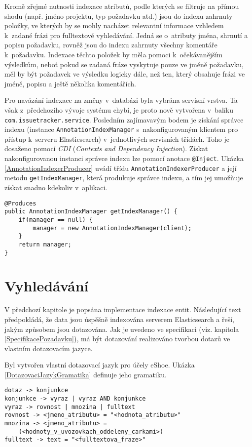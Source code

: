 \documentclass[11pt,oneside]{fithesis2}
\begin{document}
Kromě zřejmé nutnosti indexace atributů, podle kterých se filtruje na přímou shodu (např. jméno projektu, typ požadavku atd.) jsou do indexu zahrnuty položky, ve kterých by se mohly nacházet relevantní informace vzhledem k~zadané frázi pro fulltextové vyhledávání. Jedná se o~atributy jména, shrnutí a popisu požadavku, rovněž jsou do indexu zahrnuty všechny komentáře k~požadavku. Indexace těchto položek by měla pomoci k~očekávanějším výsledkům, neboť pokud se zadaná fráze vyskytuje pouze ve jméně požadavku, měl by být požadavek ve výsledku logicky dále, než ten, který obsahuje frázi ve jméně, popisu a ještě několika komentářích.

Pro navázání indexace na změny v~databázi byla vybrána servisní vrstva. Ta však z~předchozího vývoje systému chybí, je proto nově vytvořena v~balíku \texttt{com.issuetracker.service}. Posledním zajímavavým bodem je získání správce indexu (instance \texttt{AnnotationIndexManager} s~nakonfigurovaným klientem pro přístup k~serveru Elasticsearch) v~jednotlivých servisních třídách. Toho je dosaženo pomocí \emph{CDI} (\emph{Contexts and Dependency Injection}). Získat nakonfigurovanou instanci správce indexu lze pomocí anotace \texttt{@Inject}. Ukázka \ref{AnnotationIndexerProducer} uvádí třídu \texttt{AnnotationIndexerProducer} a její metodu \texttt{getIndexManager}, která produkuje správce indexu, a tím jej umožňuje získat snadno kdekoliv v~aplikaci.

\begin{lstlisting}[caption =  Použití CDI pro získávání správce indexu, label = AnnotationIndexerProducer]
@Produces
public AnnotationIndexManager getIndexManager() {
    if(manager == null) {
        manager = new AnnotationIndexManager(client);
    }
    return manager;
}
\end{lstlisting}

\section{Vyhledávání}
\label{ImplementaceVyhledavani}
V předchozí kapitole je popsána implementace indexace entit. Následující text předpokládá, že data jsou úspěšně indexována serverem Elasticsearch a řeší, jakým způsobem jsou dotazována. Jak je uvedeno ve specifikaci (viz. kapitola \ref{SpecifikacePozadavku}), má být dotazování realizováno tvorbou dotazů ve vlastním dotazovacím jazyce.

Byl vytvořen vlastní dotazovací jazyk pro účely eShoe. Ukázka \ref{DotazovaciJazykGramatika} definuje jeho gramatiku.
\begin{lstlisting}[caption =  Gramatika dotazovacího jazyka eShoe, label = DotazovaciJazykGramatika]
dotaz -> konjunkce
konjunkce -> vyraz | vyraz AND konjunkce
vyraz -> rovnost | mnozina | fulltext
rovnost -> <jmeno_atributu> = "<hodnota_atributu>"
mnozina -> <jmeno_atributu> = 
	(<hodnoty_v_uvozovkach_oddeleny_carkami>)
fulltext -> text = "<fulltextova_fraze>"
\end{lstlisting}
\end{document}
